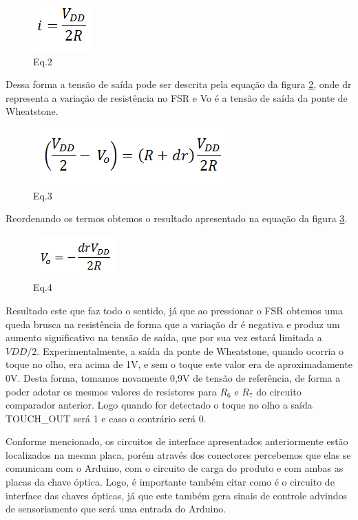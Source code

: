 \begin{figure}[H]
		\centering
			\includegraphics[scale=1.0]{figuras/eq2.png}
			\caption{Eq.2}
		\label{eq2}
\end{figure}

Dessa forma a tensão de saída pode ser descrita pela equação da figura \ref{eq3}, onde dr representa a variação de resistência no FSR e Vo é a tensão de saída da ponte de Wheatstone.

\begin{figure}[H]
		\centering
			\includegraphics[scale=1.0]{figuras/eq3.png}
				\caption{Eq.3}
		\label{eq3}
\end{figure}

Reordenando os termos obtemos o resultado apresentado na equação da figura \ref{eq4}.

\begin{figure}[H]
		\centering
			\includegraphics[scale=1.0]{figuras/eq4.png}
				\caption{Eq.4}
		\label{eq4}
\end{figure}

Resultado este que faz todo o sentido, já que ao pressionar o FSR obtemos uma queda brusca na resistência de forma que a variação dr é negativa e produz um aumento significativo na tensão de saída, que por sua vez estará limitada a $VDD/2$. Experimentalmente, a saída da ponte de Wheatstone, quando ocorria o toque no olho, era acima de 1V, e sem o toque este valor era de aproximadamente 0V. Desta forma, tomamos novamente 0,9V de tensão de referência, de forma a poder adotar os mesmos valores de resistores para $R_6$ e $R_7$ do circuito comparador anterior. Logo quando for detectado o toque no olho a saída TOUCH\_OUT será 1 e caso o contrário será 0.

Conforme mencionado, os circuitos de interface apresentados anteriormente estão localizados na mesma placa, porém através dos conectores percebemos que elas se comunicam com o Arduino, com o circuito de carga do produto e com ambas as placas da chave óptica. Logo, é importante também citar como é o circuito de interface das chaves ópticas, já que este também gera sinais de controle advindos de sensoriamento que será uma entrada do Arduino.

